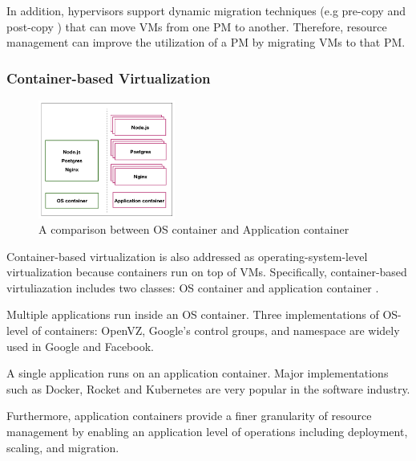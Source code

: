 In addition, hypervisors support dynamic migration techniques (e.g pre-copy \cite{Clark:2005ud} and post-copy \cite{Hines:2009fv}) that can move VMs from one PM to another. Therefore, resource management can improve the utilization of a PM by migrating VMs to that PM.


\subsubsection{Container-based Virtualization} 

\begin{figure}
	\centering
	\includegraphics[width=0.4\textwidth]{pics/container_OS_APP.png}
	\caption{A comparison between OS container and Application container \cite{Piraghaj:gb}}
	\label{fig:comparison_container}
\end{figure}

 Container-based virtualization is also addressed as operating-system-level virtualization because containers run on top of VMs. Specifically, container-based virtuliazation includes two classes: OS container and application container \cite{Piraghaj:gb}. 

Multiple applications run inside an OS container. Three implementations of OS-level of containers: OpenVZ, Google's control groups, and namespace \cite{Rosen:2013wt} are widely used in Google and Facebook.

 A single application runs on an application container. Major implementations such as Docker, Rocket and Kubernetes \cite{Bernstein:2014ur} are very popular in the software industry. 

 Furthermore, application containers provide a finer granularity of resource management by enabling an application level of operations including deployment, scaling, and migration.  

